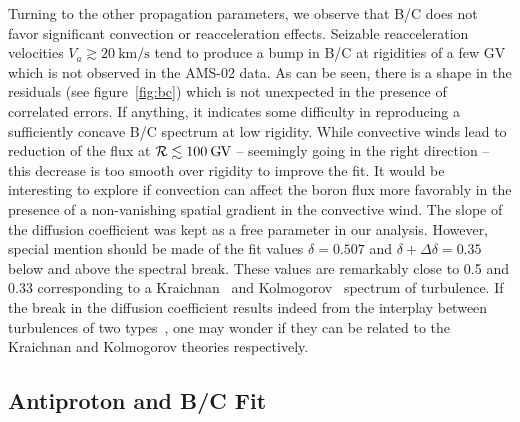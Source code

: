 \documentclass[a4paper,11pt]{article}
\newcommand{\eVdist}{\kern-0.06em}
\newcommand{\gv}{\:\text{G\eVdist V}}
\begin{document}
Turning to the other propagation parameters, we observe that B/C does not favor significant convection or reacceleration effects. Seizable reacceleration velocities $V_a\gtrsim 20\ \text{km/s}$ tend to produce a bump in B/C at rigidities of a few GV which is not observed in the AMS-02 data. As can be seen, there is a shape in the residuals (see figure~\ref{fig:bc}) which is not unexpected in the presence of correlated errors. If anything, it indicates some difficulty in reproducing a sufficiently concave B/C spectrum at low rigidity. While convective winds lead to reduction of the flux at $\mathcal{R}\lesssim 100\gv$ -- seemingly going in the right direction -- this decrease is too smooth over rigidity to improve the fit. It would be interesting to explore if convection can affect the boron flux more favorably in the presence of a non-vanishing spatial gradient in the convective wind. The slope of the diffusion coefficient was kept as a free parameter in our analysis. However, special mention should be made of the fit values $\delta=0.507$ and $\delta+\Delta\delta=0.35$ below and above the spectral break. These values are remarkably close to 0.5 and 0.33 corresponding to a Kraichnan~\cite{Kraichnan:1965zz} and Kolmogorov~\cite{Kolmogorov:1941} spectrum of turbulence. If the break in the diffusion coefficient results indeed from the interplay between turbulences of two types~\cite{Blasi:2011fm}, one may wonder if they can be related to the Kraichnan and Kolmogorov theories respectively.

\subsection{Antiproton and B/C Fit}\label{sec:pbarandbc}
\end{document}
